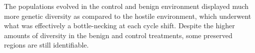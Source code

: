 The populations evolved in the control and benign environment displayed much more genetic diversity as compared to the hostile environment, which underwent what was effectively a bottle-necking at each cycle shift. Despite the higher amounts of diversity in the benign and control treatments, some preserved regions are still identifiable.

